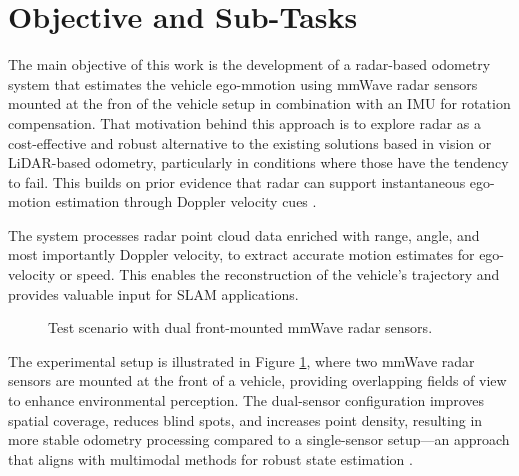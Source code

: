 \section{Objective and Sub-Tasks}
\label{sec:objective}
The main objective of this work is the development of a radar-based odometry system that estimates the vehicle ego-mmotion using mmWave radar sensors mounted at the fron of the vehicle setup in combination with an IMU for rotation compensation.
That motivation behind this approach is to explore radar as a cost-effective and robust alternative to the existing solutions based in vision or LiDAR-based odometry, particularly in conditions where those have the tendency to fail.
This builds on prior evidence that radar can support instantaneous ego-motion estimation through Doppler velocity cues \cite{EgoMotion_DopplerRadar}.

The system processes radar point cloud data enriched with range, angle, and most importantly Doppler velocity, to extract accurate motion estimates for ego-velocity or speed.
This enables the reconstruction of the vehicle’s trajectory and provides valuable input for SLAM applications.

\begin{figure}[!htbp]
    \centering
    \caption{Test scenario with dual front-mounted mmWave radar sensors.}
    \label{fig:test_scenario}
\end{figure}

The experimental setup is illustrated in Figure \ref{fig:test_scenario}, where two mmWave radar sensors are mounted at the front of a vehicle, providing overlapping fields of view to enhance environmental perception.
The dual-sensor configuration improves spatial coverage, reduces blind spots, and increases point density, resulting in more stable odometry processing compared to a single-sensor setup—an approach that aligns with multimodal methods for robust state estimation \cite{Multimodal_Offroad,HighSpeed_Estimation}.

